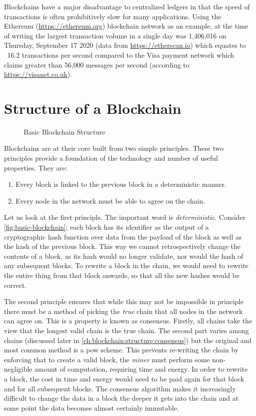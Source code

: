 Blockchains have a major disadvantage to centralized ledgers in that the speed of transactions is often prohibitively slow for many applications. Using the Ethereum (\url{https://ethereum.org}) blockchain network as an example, at the time of writing the largest transaction volume in a single day was 1,406,016 on Thursday, September 17 2020 (data from \url{https://etherscan.io}) which equates to ~16.2 transactions per second compared to the Visa payment network which claims greater than 56,000 messages per second (according to \url{https://visanet.co.uk}).


\section{Structure of a Blockchain}
\label{ch:blockchain:structure}

\begin{figure}[h]
    \centering
    
    \caption{Basic Blockchain Structure}
    \label{fig:basic-blockchain}
\end{figure}

Blockchains are at their core built from two simple principles. These two principles provide a foundation of the technology and number of useful properties. They are:

\begin{enumerate}
    \item Every block is linked to the previous block in a deterministic manner.
    \item Every node in the network must be able to agree on the chain.
\end{enumerate}

Let us look at the first principle. The important word is \emph{deterministic}. Consider \autoref{fig:basic-blockchain}; each block has its identifier as the output of a cryptographic hash function over data from the payload of the block as well as the hash of the previous block. This way we cannot retrospectively change the contents of a block, as its hash would no longer validate, nor would the hash of any subsequent blocks. To rewrite a block in the chain, we would need to rewrite the entire thing from that block onwards, so that all the new hashes would be correct.

The second principle ensures that while this may not be impossible in principle there must be a method of picking the \emph{true} chain that all nodes in the network can agree on. This is a property is known as consensus. Firstly, all chains take the view that the longest valid chain is the true chain. The second part varies among chains (discussed later in \autoref{ch:blockchain:structure:consensus}) but the original and most common method is a \gls{pow} scheme. This prevents re-writing the chain by enforcing that to create a valid block, the \emph{miner} must perform some non-negligible amount of computation, requiring time and energy. In order to rewrite a block, the cost in time and energy would need to be paid again for that block and for all subsequent blocks. The consensus algorithm makes it increasingly difficult to change the data in a block the deeper it gets into the chain and at some point the data becomes almost certainly immutable.

